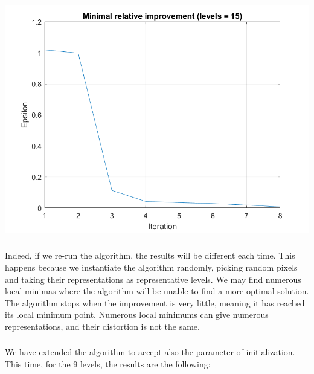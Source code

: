 \documentclass[a4paper]{iacas}
\begin{document}
\vskip 0.1in
\begin{minipage}{1\textwidth}
\centering
	\includegraphics[scale=0.9]{../imgs/imgs_q4/q4_epsilon_levels_15_init_1.png}
\end{minipage}
\vskip 0.1in


\subsubsection{}
Indeed, if we re-run the algorithm, the results will be different each time. This happens because we instantiate the algorithm randomly, picking random pixels and taking their representations as representative levels. We may find numerous local minimas where the algorithm will be unable to find a more optimal solution.  The algorithm stops when the improvement is very little, meaning it has reached its local minimum point. Numerous local minimums can give numerous representations, and their distortion is not the same.


\subsubsection{}
We have extended the algorithm to accept also the parameter of initialization. This time, for the 9 levels, the results are the following:
\end{document}
